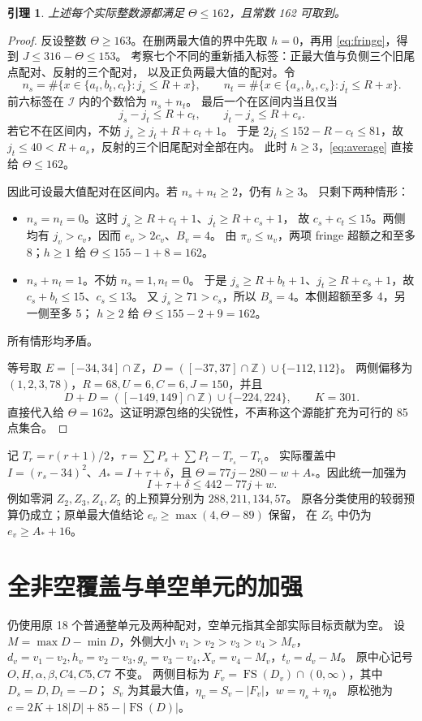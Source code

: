 \documentclass[11pt,a4paper]{article}
\newcommand{\FS}{\operatorname{FS}}
\newcommand{\Z}{\mathbb Z}
\newcommand{\A}{A_*}
\newtheorem{lemma}[theorem]{引理}
\begin{document}
\begin{lemma}\label{lem:162}
上述每个实际整数源都满足 $\Theta\le162$，且常数 162 可取到。
\end{lemma}
\begin{proof}
反设整数 $\Theta\ge163$。在删两最大值的界中先取 $h=0$，再用
\eqref{eq:fringe}，得到 $J\le316-\Theta\le153$。
考察七个不同的重新插入标签：正最大值与负侧三个旧尾点配对、反射的三个配对，
以及正负两最大值的配对。令
\[
n_s=\#\{x\in\{a_t,b_t,c_t\}:j_s\le R+x\},\qquad
n_t=\#\{x\in\{a_s,b_s,c_s\}:j_t\le R+x\}.
\]
前六标签在 $\mathcal I$ 内的个数恰为 $n_s+n_t$。
最后一个在区间内当且仅当
\[j_s-j_t\le R+c_t,\qquad j_t-j_s\le R+c_s.\]
若它不在区间内，不妨 $j_s\ge j_t+R+c_t+1$。
于是 $2j_t\le152-R-c_t\le81$，故 $j_t\le40<R+a_s$，反射的三个旧尾配对全部在内。
此时 $h\ge3$，\eqref{eq:average} 直接给 $\Theta\le162$。

因此可设最大值配对在区间内。若 $n_s+n_t\ge2$，仍有 $h\ge3$。
只剩下两种情形：
\begin{itemize}
\item $n_s=n_t=0$。这时 $j_s\ge R+c_t+1$、$j_t\ge R+c_s+1$，
故 $c_s+c_t\le15$。两侧均有 $j_v>c_v$，因而 $e_v>2c_v$、$B_v=4$。
由 $\pi_v\le u_v$，两项 fringe 超额之和至多 8；$h\ge1$ 给 $\Theta\le155-1+8=162$。
\item $n_s+n_t=1$。不妨 $n_s=1,n_t=0$。
于是 $j_s\ge R+b_t+1$、$j_t\ge R+c_s+1$，故 $c_s+b_t\le15$、$c_s\le13$。
又 $j_s\ge71>c_s$，所以 $B_s=4$。本侧超额至多 4，另一侧至多 5；
$h\ge2$ 给 $\Theta\le155-2+9=162$。
\end{itemize}
所有情形均矛盾。

等号取 $E=[-34,34]\cap\Z$，$D=([-37,37]\cap\Z)\cup\{-112,112\}$。
两侧偏移为 $(1,2,3,78)$，$R=68,U=6,C=6,J=150$，并且
\[D+D=([-149,149]\cap\Z)\cup\{-224,224\},\qquad K=301.\]
直接代入给 $\Theta=162$。这证明源包络的尖锐性，不声称这个源能扩充为可行的 85 点集合。
\end{proof}

记 $T_r=r(r+1)/2$，$\tau=\sum P_s+\sum P_t-T_{r_s}-T_{r_t}$。
实际覆盖中 $I=(r_s-34)^2$、$\A=I+\tau+\delta$，且
$\Theta=77j-280-w+\A$。因此统一加强为
\begin{equation}\label{eq:budget}
\boxed{I+\tau+\delta\le442-77j+w.}
\end{equation}
例如零洞 $Z_2,Z_3,Z_4,Z_5$ 的上预算分别为 $288,211,134,57$。
原各分类使用的较弱预算仍成立；原单最大值结论 $e_v\ge\max(4,\Theta-89)$ 保留，
在 $Z_5$ 中仍为 $e_v\ge\A+16$。

\section{全非空覆盖与单空单元的加强}\label{sec:gaps}
仍使用原 18 个普通整单元及两种配对，空单元指其全部实际目标贡献为空。
设 $M=\max D-\min D$，外侧大小 $v_1>v_2>v_3>v_4>M_v$，
$d_v=v_1-v_2,h_v=v_2-v_3,g_v=v_3-v_4,X_v=v_4-M_v$，$t_v=d_v-M$。
原中心记号 $O,H,\alpha,\beta,C4,C5,C7$ 不变。
两侧目标为 $F_v=\FS(D_v)\cap(0,\infty)$，其中 $D_s=D,D_t=-D$；
$S_v$ 为其最大值，$\eta_v=S_v-|F_v|$，$w=\eta_s+\eta_t$。
原松弛为 $c=2K+18|D|+85-|\FS(D)|$。
\end{document}
